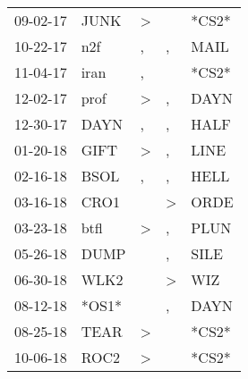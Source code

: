\begin{supertabular}{p{0.07\textwidth}p{0.06\textwidth}p{0.02\textwidth}p{0.02\textwidth}p{0.06\textwidth}}
          09-02-17\textsuperscript{} &           JUNK\textsuperscript{} &     \textgreater &                  &                            *CS2* \\
          10-22-17\textsuperscript{} &            n2f\textsuperscript{} &                , &                , &           MAIL\textsuperscript{} \\
          11-04-17\textsuperscript{} &           iran\textsuperscript{} &                , &                  &                            *CS2* \\
          12-02-17\textsuperscript{} &           prof\textsuperscript{} &     \textgreater &                , &           DAYN\textsuperscript{} \\
          12-30-17\textsuperscript{} &           DAYN\textsuperscript{} &                , &                , &           HALF\textsuperscript{} \\
          01-20-18\textsuperscript{} &           GIFT\textsuperscript{} &     \textgreater &                , &           LINE\textsuperscript{} \\
          02-16-18\textsuperscript{} &           BSOL\textsuperscript{} &                , &                , &           HELL\textsuperscript{} \\
          03-16-18\textsuperscript{} &           CRO1\textsuperscript{} &                  &     \textgreater &           ORDE\textsuperscript{} \\
          03-23-18\textsuperscript{} &           btfl\textsuperscript{} &     \textgreater &                , &           PLUN\textsuperscript{} \\
          05-26-18\textsuperscript{} &           DUMP\textsuperscript{} &                  &                , &           SILE\textsuperscript{} \\
          06-30-18\textsuperscript{} &           WLK2\textsuperscript{} &                  &     \textgreater &            WIZ\textsuperscript{} \\
          08-12-18\textsuperscript{} &                            *OS1* &                  &                , &           DAYN\textsuperscript{} \\
          08-25-18\textsuperscript{} &           TEAR\textsuperscript{} &     \textgreater &                  &                            *CS2* \\
          10-06-18\textsuperscript{} &           ROC2\textsuperscript{} &     \textgreater &                  &                            *CS2* \\

\end{supertabular}
